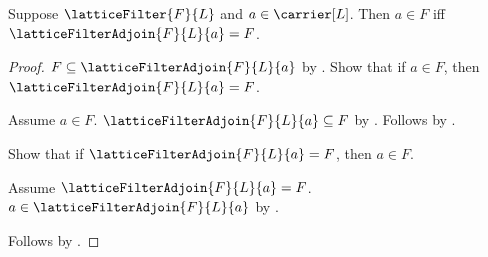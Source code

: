 \begin{theorem}\label{lattice_filter_adjoin_eq_self_iff}
    Suppose $\latticeFilter{F}{L}$ and $a\in\carrier[L]$.
    Then $a\in F$ iff $\latticeFilterAdjoin{F}{L}{a}=F$.
\end{theorem}
\begin{proof}
    $F\subseteq\latticeFilterAdjoin{F}{L}{a}$ by
        .
    Show that if $a\in F$, then
        $\latticeFilterAdjoin{F}{L}{a}=F$.
    \begin{subproof}
        Assume $a\in F$.
        $\latticeFilterAdjoin{F}{L}{a}\subseteq F$ by
            .
        Follows by .
    \end{subproof}
    Show that if $\latticeFilterAdjoin{F}{L}{a}=F$, then $a\in F$.
    \begin{subproof}
        Assume $\latticeFilterAdjoin{F}{L}{a}=F$.
        $a\in\latticeFilterAdjoin{F}{L}{a}$ by
            .
    \end{subproof}
    Follows by \auto.
\end{proof}

